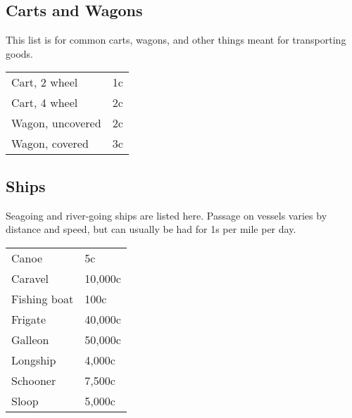 \subsection{Carts and Wagons}

This list is for common carts, wagons, and other things meant for transporting goods.

\begin{center}
{
\begin{xtabular}{|l|l|}
Cart, 2 wheel & 1c \\
Cart, 4 wheel & 2c \\
Wagon, uncovered & 2c \\
Wagon, covered & 3c \\
\hline
\end{xtabular}
}
\end{center}

\subsection{Ships}

Seagoing and river-going ships are listed here. Passage on vessels varies by distance and speed,
but can usually be had for 1s per mile per day.

\begin{center}
{
\begin{xtabular}{|l|l|}
Canoe & 5c \\
Caravel & 10,000c \\
Fishing boat & 100c \\
Frigate & 40,000c \\
Galleon & 50,000c \\
Longship & 4,000c \\
Schooner & 7,500c \\
Sloop & 5,000c \\
\hline
\end{xtabular}
}
\end{center}

